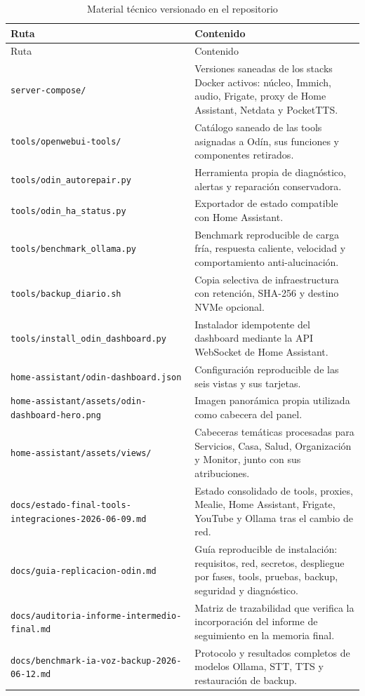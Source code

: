 \begin{longtable}{p{}p{}}
  \caption{Material técnico versionado en el repositorio}
  \label{tab:material-versionado}\\
    \toprule
    Ruta & Contenido \\
    \midrule
    \endfirsthead
    \toprule
    Ruta & Contenido \\
    \midrule
    \endhead
    \nolinkurl{server-compose/} & Versiones saneadas de los stacks Docker activos: núcleo, Immich, audio, Frigate, proxy de Home Assistant, Netdata y PocketTTS. \\
    \nolinkurl{tools/openwebui-tools/} & Catálogo saneado de las tools asignadas a Odín, sus funciones y componentes retirados. \\
    \nolinkurl{tools/odin_autorepair.py} & Herramienta propia de diagnóstico, alertas y reparación conservadora. \\
    \nolinkurl{tools/odin_ha_status.py} & Exportador de estado compatible con Home Assistant. \\
    \nolinkurl{tools/benchmark_ollama.py} & Benchmark reproducible de carga fría, respuesta caliente, velocidad y comportamiento anti-alucinación. \\
    \nolinkurl{tools/backup_diario.sh} & Copia selectiva de infraestructura con retención, SHA-256 y destino NVMe opcional. \\
    \nolinkurl{tools/install_odin_dashboard.py} & Instalador idempotente del dashboard mediante la API WebSocket de Home Assistant. \\
    \nolinkurl{home-assistant/odin-dashboard.json} & Configuración reproducible de las seis vistas y sus tarjetas. \\
    \nolinkurl{home-assistant/assets/odin-dashboard-hero.png} & Imagen panorámica propia utilizada como cabecera del panel. \\
    \nolinkurl{home-assistant/assets/views/} & Cabeceras temáticas procesadas para Servicios, Casa, Salud, Organización y Monitor, junto con sus atribuciones. \\
    \texttt{docs/estado-final-tools-}\newline\texttt{integraciones-2026-06-09.md} & Estado consolidado de tools, proxies, Mealie, Home Assistant, Frigate, YouTube y Ollama tras el cambio de red. \\
    \nolinkurl{docs/guia-replicacion-odin.md} & Guía reproducible de instalación: requisitos, red, secretos, despliegue por fases, tools, pruebas, backup, seguridad y diagnóstico. \\
    \texttt{docs/auditoria-informe-}\newline\texttt{intermedio-final.md} & Matriz de trazabilidad que verifica la incorporación del informe de seguimiento en la memoria final. \\
    \texttt{docs/benchmark-ia-voz-backup-}\newline\texttt{2026-06-12.md} & Protocolo y resultados completos de modelos Ollama, STT, TTS y restauración de backup. \\
    \bottomrule
\end{longtable}

